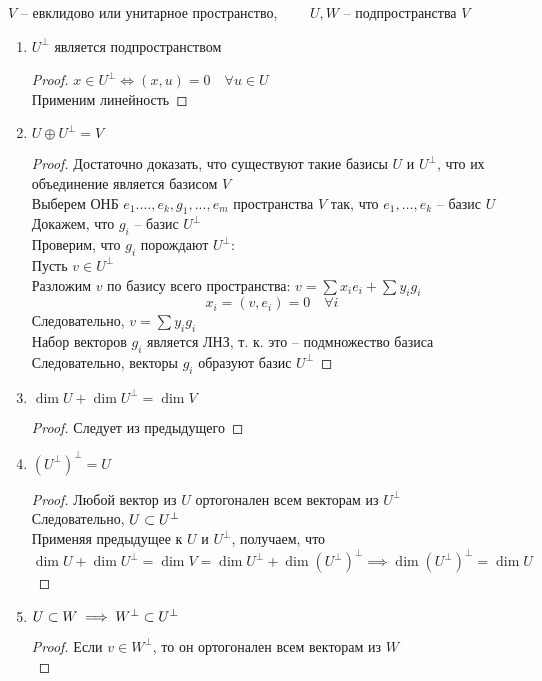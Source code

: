 \begin{properties}
	$ V $ -- евклидово или унитарное пространство, $ \qquad U, W $ -- подпространства $ V $
	\begin{enumerate}
		\item $ U^\perp $ является подпространством
		\begin{proof}
			$ x \in U^\perp \iff (x, u) = 0 \quad \forall u \in U $ \\
			Применим линейность
		\end{proof}
		\item $ U \oplus U^\perp = V $
		\begin{proof}
			Достаточно доказать, что существуют такие базисы $ U $ и $ U^\perp $, что их объединение является базисом $ V $ \\
			Выберем ОНБ $ e_1 ...., e_k, g_1, ..., e_m $ пространства $ V $ так, что $ e_1, ..., e_k $ -- базис $ U $ \\
			Докажем, что $ g_i $ -- базис $ U^\perp $ \\
			Проверим, что $ g_i $ порождают $ U^\perp $: \\
			Пусть $ v \in U^\perp $ \\
			Разложим $ v $ по базису всего пространства: $ v = \sum x_ie_i + \sum y_ig_i $
			$$ x_i = (v, e_i) = 0 \quad \forall i $$
			Следовательно, $ v = \sum y_ig_i $ \\
			Набор векторов $ g_i $ является ЛНЗ, т. к. это -- подмножество базиса \\
			Следовательно, векторы $ g_i $ образуют базис $ U^\perp $
		\end{proof}
		\item $ \dim U + \dim U^\perp = \dim V $
		\begin{proof}
			Следует из предыдущего
		\end{proof}
		\item\label{en:434} $ (U^\perp)^\perp = U $
		\begin{proof}
			Любой вектор из $ U $ ортогонален всем векторам из $ U^\perp $ \\
			Следовательно, $ U \subset U^\perp $ \\
			Применяя предыдущее к $ U $ и $ U^\perp $, получаем, что
			$$ \dim U + \dim U^\perp = \dim V = \dim U^\perp + \dim (U^\perp)^\perp \implies \dim (U^\perp)^\perp = \dim U $$
		\end{proof}
		\item $ U \subset W \implies W^\perp \subset U^\perp $
		\begin{proof}
			Если $ v \in W^\perp $, то он ортогонален всем векторам из $ W $ \\

\end{proof}
\end{enumerate}
\end{properties}
